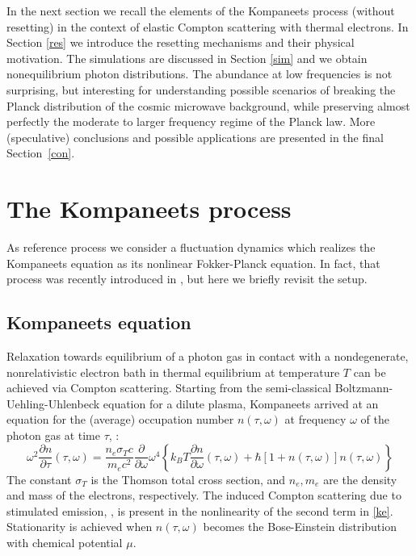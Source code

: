 \documentclass[a4paper,12pt,reqno,superscriptaddress,nofootinbib]{revtex4}
\theoremstyle{plain}
\theoremstyle{definition}
\theoremstyle{remark}
\newcommand{\0}{^{(0)}}
\newcommand{\1}{^{(1)}}
\newcommand{\2}{^{(2)}}
\begin{document}
In the next section we recall the elements of the Kompaneets process (without resetting) in the context of elastic Compton scattering with thermal electrons. In Section \ref{res} we introduce the resetting mechanisms and their physical motivation.  The simulations are discussed in Section \ref{sim} and we obtain nonequilibrium photon distributions.  The abundance at low frequencies is not surprising, but interesting for understanding possible scenarios of breaking the Planck distribution of the cosmic microwave background, while preserving almost perfectly the moderate to larger frequency regime of the Planck law.  More (speculative) conclusions and possible applications are presented in the final Section~\ref{con}. 

\section{The Kompaneets process}

As reference process we consider a fluctuation dynamics which realizes the Kompaneets equation as its nonlinear Fokker-Planck equation. In fact, that process was recently introduced in \cite{paper2}, but here we briefly revisit the setup.

\subsection{Kompaneets equation}
Relaxation towards equilibrium of a photon gas in contact with a nondegenerate, nonrelativistic electron bath in thermal equilibrium at temperature $T$ can be achieved via Compton scattering. Starting from the semi-classical Boltzmann-Uehling-Uhlenbeck equation for a dilute plasma, Kompaneets arrived at an equation for the (average) occupation number $n(\tau,\omega)$ at frequency $\omega$ of the photon gas at time $\tau$, \cite{kompa}:
\begin{equation}\label{ke}
\omega^2\frac{\partial n}{\partial \tau}(\tau,\omega)= \frac{n_e\sigma_T 
	c}{m_e c^2}\frac{\partial }{\partial \omega}\omega^4\left\{k_B T 
\frac{\partial n}{\partial \omega}(\tau,\omega) + 
\hbar\left[1+n(\tau,\omega)\right]n(\tau,\omega)\right\}
\end{equation}
The constant $\sigma_T$ is the Thomson total cross section, and $n_e,m_e$ are  the density and mass of the electrons, respectively.
The induced Compton scattering due to stimulated emission, \cite{liedahl, blandford}, is present in the nonlinearity of the second term in \eqref{ke}. Stationarity is achieved when $n(\tau,\omega)$ becomes the Bose-Einstein distribution with chemical potential $\mu$.
\end{document}
